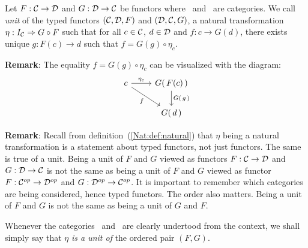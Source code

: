 \begin{defin}\label{Adj:def:unit}
    Let $F:\mbox{$\cal C$}\to\mbox{$\cal D$}$ and $G:\mbox{$\cal D$}\to\mbox{$\cal C$}$ be functors where \Cat\ and \Dat\ 
    are categories. We call {\em unit} of the typed functors $(\mbox{$\cal C$},\mbox{$\cal D$},F)$
    and $(\mbox{$\cal D$},\mbox{$\cal C$},G)$, a natural transformation 
    $\eta:I_{\cal C}\Rightarrow G\circ F$ such that for all 
    $c\in\mbox{$\cal C$}$, $d\in\mbox{$\cal D$}$ and $f:c\to G(d)$, there exists 
    unique $g:F(c) \to d$ such that $f = G(g) \circ \eta_{c}$.
\end{defin}

\noindent
{\bf Remark}: The equality $f = G(g) \circ \eta_{c}$ can be visualized with
the diagram:
    \[
        \begin{tikzcd}
            c \arrow[rd,swap, "f"]\arrow[r,"\eta_{c}"] 
            &G(\,F(c)\,)\arrow[d,"G(\,g\,)"]\\
            & G(\,d\,)
        \end{tikzcd}
    \]

\noindent
{\bf Remark}: Recall from definition~(\ref{Nat:def:natural}) that $\eta$ being
a natural transformation is a statement about typed functors, not just functors. 
The same is true of a unit. Being a unit of $F$ and $G$ viewed as functors 
$F:\mbox{$\cal C$}\to\mbox{$\cal D$}$ and $G:\mbox{$\cal D$}\to\mbox{$\cal C$}$ is not the same as being a unit of $F$ 
and $G$ viewed as functor $F:\mbox{${\cal C}^{op}$}\to\mbox{${\cal D}^{op}$}$ and $G:\mbox{${\cal D}^{op}$}\to\mbox{${\cal C}^{op}$}$. It is important
to remember which categories are being considered, hence typed functors. The
order also matters. Being a unit of $F$ and $G$ is not the same as being a unit
of $G$ and $F$.

\begin{notation}\label{Adj:notation:unit}
    Whenever the categories \Cat\ and \Dat\ are clearly undertood from the 
    context, we shall simply say that $\eta$ {\em is a unit of} the
    ordered pair $(F,G)$.
\end{notation}

